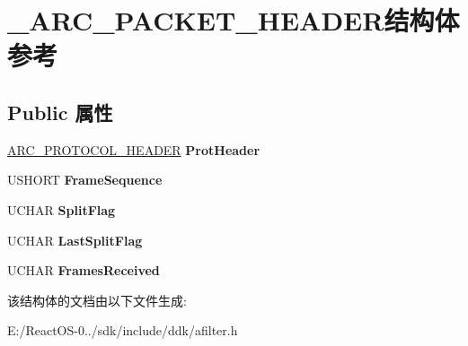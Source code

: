 \hypertarget{struct___a_r_c___p_a_c_k_e_t___h_e_a_d_e_r}{}\section{\+\_\+\+A\+R\+C\+\_\+\+P\+A\+C\+K\+E\+T\+\_\+\+H\+E\+A\+D\+E\+R结构体 参考}
\label{struct___a_r_c___p_a_c_k_e_t___h_e_a_d_e_r}
\subsection*{Public 属性}
\begin{DoxyCompactItemize}
\item 
\mbox{\label{struct___a_r_c___p_a_c_k_e_t___h_e_a_d_e_r_ac8cab5d46d2c623bc33c2765cc17aab7}} 
\hyperlink{struct___a_r_c___p_r_o_t_o_c_o_l___h_e_a_d_e_r}{A\+R\+C\+\_\+\+P\+R\+O\+T\+O\+C\+O\+L\+\_\+\+H\+E\+A\+D\+ER} {\bfseries Prot\+Header}
\item 
\mbox{\label{struct___a_r_c___p_a_c_k_e_t___h_e_a_d_e_r_a565ac87eb82fde44a2e1938b1176e908}} 
U\+S\+H\+O\+RT {\bfseries Frame\+Sequence}
\item 
\mbox{\label{struct___a_r_c___p_a_c_k_e_t___h_e_a_d_e_r_a3274f9220f1eb47ab089f561f05d83ff}} 
U\+C\+H\+AR {\bfseries Split\+Flag}
\item 
\mbox{\label{struct___a_r_c___p_a_c_k_e_t___h_e_a_d_e_r_a3430f5d9937da52573f2cd9711baeaa3}} 
U\+C\+H\+AR {\bfseries Last\+Split\+Flag}
\item 
\mbox{\label{struct___a_r_c___p_a_c_k_e_t___h_e_a_d_e_r_a69af8970295f98442e5db8a5f0ad90de}} 
U\+C\+H\+AR {\bfseries Frames\+Received}
\end{DoxyCompactItemize}


该结构体的文档由以下文件生成\+:\begin{DoxyCompactItemize}
\item 
E\+:/\+React\+O\+S-\/0../sdk/include/ddk/afilter.\+h\end{DoxyCompactItemize}
